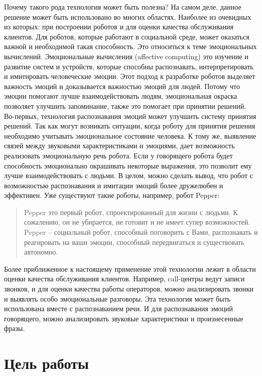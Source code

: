 \documentclass[14pt]{extarticle}
\begin{document}
Почему такого рода технология может быть полезна? На самом деле, данное решение может быть использовано во многих областях. Наиболее из очевидных из которых: при построении роботов и для оценки качества обслуживания клиентов.
Для роботов, которые работают в социальной среде, может оказаться важной и необходимой такая способность. Это относиться к теме эмоциональных вычислений. 
Эмоциональные вычисления (affective computing) это изучение и развитие систем и устройств, которые способны распознавать, интерпретировать и имитировать человеческие эмоции. Этот подход к разработке роботов выделяет важность эмоций и доказывается важностью эмоций для людей. Потому что эмоции помогают лучше взаимодействовать людям, эмоциональная окраска позволяет улучшить запоминание, также это помогает при принятии решений.
Во-первых, технология распознавания эмоций может улучшить систему принятия решений. Так как могут возникать ситуации, когда роботу для принятия решения необходимо учитывать эмоциональное состояние человека. К тому же, выявление связей между звуковыми характеристиками и эмоциями, дает возможность реализовать эмоциональную речь робота. Если у говорящего робота будет способность эмоционально окрашивать некоторые выражения, это позволит ему лучше взаимодействовать с людьми. В целом, можно сделать вывод, что робот с возможностью распознавания и имитации эмоций более дружелюбен и эффективен. Уже существуют такие роботы, например, робот Pepper:
\begin{quote}
	Pepper это первый робот, спроектированный для жизни с людьми. К сожалению, он не убирается, не готовит и не имеет супер возможностей. Pepper – социальный робот, способный поговорить с Вами, распознавать и реагировать на ваши эмоции, способный передвигаться и существовать автономно.\cite{pepper}
\end{quote}
Более приближенное к настоящему применение этой технологии лежит в области оценки качества обслуживания клиентов. Например, call-центры ведут записи звонков, и для оценки качества работы операторов, можно анализировать звонки и выявлять особо эмоциональные разговоры. Эта технология может быть использована вместе с распознаванием речи. И для распознавания эмоций говорящего, можно анализировать звуковые характеристики и произнесенные фразы.

\section{Цель работы}
\end{document}
